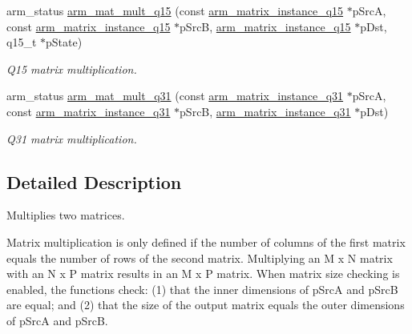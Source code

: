 \begin{DoxyCompactItemize}
arm\-\_\-status \hyperlink{group___matrix_mult_ga7521d59196189bb6dde26e8cdfb66e21}{arm\-\_\-mat\-\_\-mult\-\_\-q15} (const \hyperlink{structarm__matrix__instance__q15}{arm\-\_\-matrix\-\_\-instance\-\_\-q15} $\ast$p\-Src\-A, const \hyperlink{structarm__matrix__instance__q15}{arm\-\_\-matrix\-\_\-instance\-\_\-q15} $\ast$p\-Src\-B, \hyperlink{structarm__matrix__instance__q15}{arm\-\_\-matrix\-\_\-instance\-\_\-q15} $\ast$p\-Dst, q15\-\_\-t $\ast$p\-State)
\begin{DoxyCompactList}\small\item\em Q15 matrix multiplication. \end{DoxyCompactList}\item 
arm\-\_\-status \hyperlink{group___matrix_mult_ga2ec612a8c2c4916477fb9bc1ab548a6e}{arm\-\_\-mat\-\_\-mult\-\_\-q31} (const \hyperlink{structarm__matrix__instance__q31}{arm\-\_\-matrix\-\_\-instance\-\_\-q31} $\ast$p\-Src\-A, const \hyperlink{structarm__matrix__instance__q31}{arm\-\_\-matrix\-\_\-instance\-\_\-q31} $\ast$p\-Src\-B, \hyperlink{structarm__matrix__instance__q31}{arm\-\_\-matrix\-\_\-instance\-\_\-q31} $\ast$p\-Dst)
\begin{DoxyCompactList}\small\item\em Q31 matrix multiplication. \end{DoxyCompactList}\end{DoxyCompactItemize}


\subsection{Detailed Description}
Multiplies two matrices.



Matrix multiplication is only defined if the number of columns of the first matrix equals the number of rows of the second matrix. Multiplying an {\ttfamily M x N} matrix with an {\ttfamily N x P} matrix results in an {\ttfamily M x P} matrix. When matrix size checking is enabled, the functions check\-: (1) that the inner dimensions of {\ttfamily p\-Src\-A} and {\ttfamily p\-Src\-B} are equal; and (2) that the size of the output matrix equals the outer dimensions of {\ttfamily p\-Src\-A} and {\ttfamily p\-Src\-B}. 

